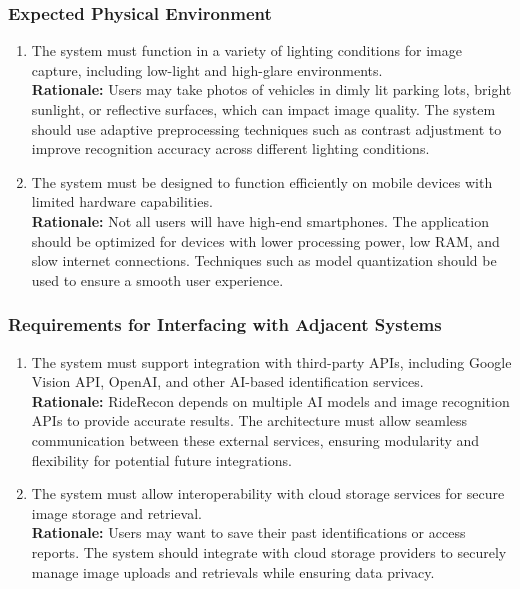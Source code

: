 \documentclass[]{article}
\begin{document}
\subsubsection{Expected Physical Environment}
\label{ssub:expected_physical_environment}
\begin{enumerate}[label={OE-EPE\arabic*.}]
    \item The system must function in a variety of lighting conditions for image capture, including low-light and high-glare environments.\\
   \textbf{Rationale:} Users may take photos of vehicles in dimly lit parking lots, bright sunlight, or reflective surfaces, which can impact image quality. The system should use adaptive preprocessing techniques such as contrast adjustment to improve recognition accuracy across different lighting conditions.
   \item The system must be designed to function efficiently on mobile devices with limited hardware capabilities.\\
   \textbf{Rationale:} Not all users will have high-end smartphones. The application should be optimized for devices with lower processing power, low RAM, and slow internet connections. Techniques such as model quantization should be used to ensure a smooth user experience.
\end{enumerate}

\subsubsection{Requirements for Interfacing with Adjacent Systems}
\label{ssub:requirements_for_interfacing_with_adjacent_systems}
\begin{enumerate}[label={OE-IA\arabic*.}]
    \item The system must support integration with third-party APIs, including Google Vision API, OpenAI, and other AI-based identification services.\\
	\textbf{Rationale:} RideRecon depends on multiple AI models and image recognition APIs to provide accurate results. The architecture must allow seamless communication between these external services, ensuring modularity and flexibility for potential future integrations.
	\item The system must allow interoperability with cloud storage services for secure image storage and retrieval.\\
	\textbf{Rationale:} Users may want to save their past identifications or access reports. The system should integrate with cloud storage providers to securely manage image uploads and retrievals while ensuring data privacy.
\end{enumerate}
\end{document}
